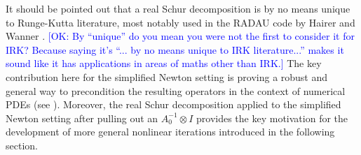 \documentclass[review]{siamart}
\newcommand{\OK}[1]{\textcolor{blue}{[OK: #1]}}
\begin{document}
%
\begin{remark}
It should be pointed out that a real Schur decomposition is by no means
unique to Runge-Kutta literature, most notably used in the RADAU code
by Hairer and Wanner \cite{hairer99}.
%
\OK{By ``unique'' do you mean you were not the first to consider it for IRK? Because saying it's ``... by no means unique to IRK literature...'' makes it sound like it has applications in areas of maths other than IRK.}
%
The key contribution here for the simplified Newton setting is proving a
robust and general way to precondition the resulting operators in the
context of numerical PDEs (see ). Moreover, the real
Schur decomposition applied to the simplified Newton setting after
pulling out an $A_0^{-1}\otimes I$ provides the key motivation for
the development of more general nonlinear iterations introduced in
the following section.
\end{remark}
\end{document}
